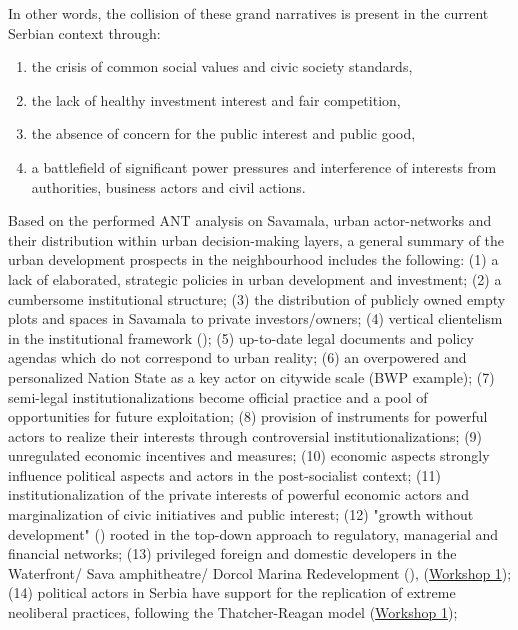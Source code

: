 \documentclass[11pt]{report}
\begin{document}
In other words, the collision of these grand narratives is present in the current Serbian context through:
\begin{enumerate}
\item  the crisis of common social values and civic society standards, 
\item the lack of healthy investment interest and fair competition, 
\item the absence of concern for the public interest and public good,
\item a battlefield of significant power pressures and interference of interests from authorities, business actors and civil actions.
\end{enumerate}

Based on the performed ANT analysis on Savamala, urban actor-networks and their distribution within urban decision-making layers, a general summary of the urban development prospects in the neighbourhood includes the following: 
(1) a lack of elaborated, strategic policies in urban development and investment;
(2) a cumbersome institutional structure;
(3) the distribution of publicly owned empty plots and spaces in Savamala to private investors/owners;
(4) vertical clientelism in the institutional framework (\href{Vujovic}{\citealt{vujovic_belgrades_2007}});
(5) up-to-date legal documents and policy agendas which do not correspond to urban reality;
(6) an overpowered and personalized Nation State as a key actor on citywide scale (BWP example);
(7) semi-legal institutionalizations become official practice and a pool of opportunities for future exploitation;
(8) provision of instruments for powerful actors to realize their interests through controversial institutionalizations;
(9) unregulated economic incentives and measures;
(10) economic aspects strongly influence political aspects and actors in the post-socialist context;
(11) institutionalization of the private interests of powerful economic actors and marginalization of civic initiatives and public interest;
(12) "growth without development" (\cite{Vujosevic and Maricic, 2012}) rooted in the top-down approach to regulatory, managerial and financial networks;
(13) privileged foreign and domestic developers in the Waterfront/ Sava amphitheatre/ Dorcol Marina Redevelopment (\href{Djordjevic}{\citealt{djordjevic_system_2009}}), (\href{Expert Workshop}{Workshop 1});
(14) political actors in Serbia have support for the replication of extreme neoliberal practices, following the Thatcher-Reagan model  (\href{Expert Workshop}{Workshop 1});
\end{document}
